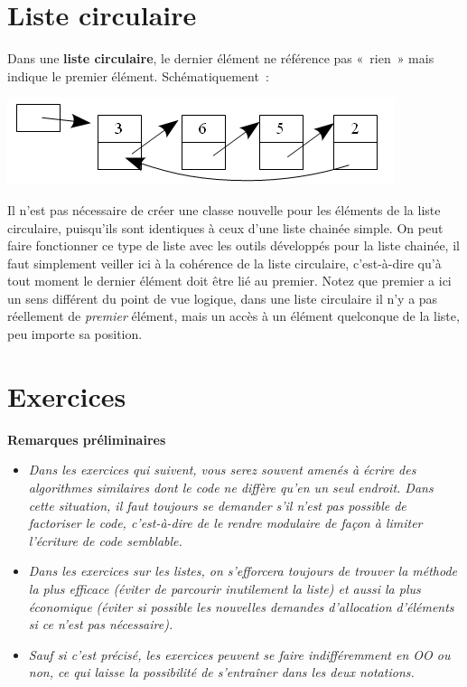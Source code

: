 \section{Liste circulaire}

	Dans une \textbf{liste circulaire}, le dernier élément ne référence 
	pas «~rien~» mais indique le premier élément.
	Schématiquement~:

	\begin{center}
	\includegraphics[width=11.351cm,height=2.54cm]{image/a2012Logique2eme-img009.png}
	\end{center}
	
	Il n'est pas nécessaire de créer une classe nouvelle pour les 
	éléments de la liste circulaire, puisqu'ils sont
	identiques à ceux d'une liste chainée simple. On peut faire fonctionner 
	ce type de liste avec les outils développés
	pour la liste chainée, il faut simplement veiller ici à la cohérence 
	de la liste circulaire, c'est-à-dire qu'à tout
	moment le dernier élément doit être lié au premier. Notez que premier 
	a ici un sens différent du point de vue logique,
	dans une liste circulaire il n'y a pas réellement de \textit{premier} 
	élément, mais un accès à un élément quelconque de
	la liste, peu importe sa position.
	
	
\section{Exercices}

	{\bfseries
	Remarques préliminaires}

	\begin{itemize}
		\item 
			\textit{Dans les exercices qui suivent, vous serez souvent amenés à 
			écrire des algorithmes similaires dont le code ne diffère
			qu'en un seul endroit. Dans cette situation, il faut toujours se 
			demander s'il n'est pas possible de factoriser le
			code, c'est-à-dire de le rendre modulaire de façon à limiter 
			l'écriture de code semblable.}
		\item
			\textit{Dans les exercices sur les listes, on s'efforcera toujours 
			de trouver la méthode la plus efficace (éviter de parcourir
			inutilement la liste) et aussi la plus économique (éviter si possible 
			les nouvelles demandes d'allocation d'éléments si
			ce n'est pas nécessaire).}
		\item 
			\textit{Sauf si c'est précisé, les exercices peuvent se faire 
			indifféremment en OO ou non, ce qui laisse la possibilité de
			s'entraîner dans les deux notations.}
	\end{itemize}
	
